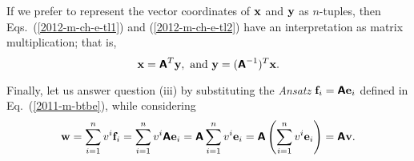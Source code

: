 If we prefer to represent the vector coordinates of
${\bf x}$ and ${\bf y}$ as $n$-tuples,
then Eqs.~(\ref{2012-m-ch-e-tl1})  and (\ref{2012-m-ch-e-tl2})
have an interpretation as matrix multiplication; that is,
\begin{equation}
{\bf x} =  \textsf{\textbf{A}}^T{\bf y}, {\text{ and }}
{\bf y} =  (\textsf{\textbf{A}}^{-1})^T{\bf x}
.
\label{2012-m-ch-e-tl3}
\end{equation}

Finally, let us answer question (iii)
by substituting the {\it Ansatz} ${\bf f}_i  =\textsf{\textbf{A}}{\bf e}_i$ defined in  Eq.~(\ref{2011-m-btbe}),
while considering
\begin{equation}
{\bf w}= \sum_{i=1}^n v^i {\bf f}_i  = \sum_{i=1}^n v^i \textsf{\textbf{A}}{\bf e}_i= \textsf{\textbf{A}} \sum_{i=1}^n v^i {\bf e}_i
= \textsf{\textbf{A}} \left( \sum_{i=1}^n v^i {\bf e}_i \right)
=   \textsf{\textbf{A}}{\bf v}
.
\end{equation}





